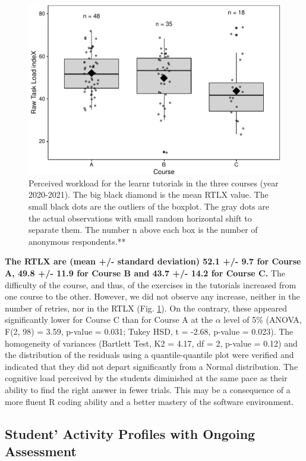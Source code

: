 \documentclass{aims}
\theoremstyle{definition}
\begin{document}
\begin{figure}
\includegraphics[width=1\linewidth]{teaching_data_science_files/figure-latex/fig_rtlx-1} \caption{\label{fig:fig_rtlx} Perceived workload for the learnr tutorials in the three courses (year 2020-2021). The big black diamond is the mean RTLX value. The small black dots are the outliers of the boxplot. The gray dots are the actual observations with small random horizontal shift to separate them. The number n above each box is the number of anonymous respondents.**}\label{fig:fig_rtlx}
\end{figure}

\textbf{The RTLX are (mean +/- standard deviation) 52.1 +/- 9.7 for
Course A, 49.8 +/- 11.9 for Course B and 43.7 +/- 14.2 for Course C.}
The difficulty of the course, and thus, of the exercises in the
tutorials increased from one course to the other. However, we did not
observe any increase, neither in the number of retries, nor in the RTLX
(Fig. \ref {fig:fig_rtlx}). On the contrary, these appeared
significantly lower for Course C than for Course A at the \(\alpha\)
level of 5\% (ANOVA, F(2, 98) = 3.59, p-value = 0.031; Tukey HSD, t =
-2.68, p-value = 0.023). The homogeneity of variances (Bartlett Test, K2
= 4.17, df = 2, p-value = 0.12) and the distribution of the residuals
using a quantile-quantile plot were verified and indicated that they did
not depart significantly from a Normal distribution. The cognitive load
perceived by the students diminished at the same pace as their ability
to find the right answer in fewer trials. This may be a consequence of a
more fluent R coding ability and a better mastery of the software
environment.

\hypertarget{student-activity-profiles-with-ongoing-assessment}{%
\subsection{Student' Activity Profiles with Ongoing
Assessment}\label{student-activity-profiles-with-ongoing-assessment}}
\end{document}
